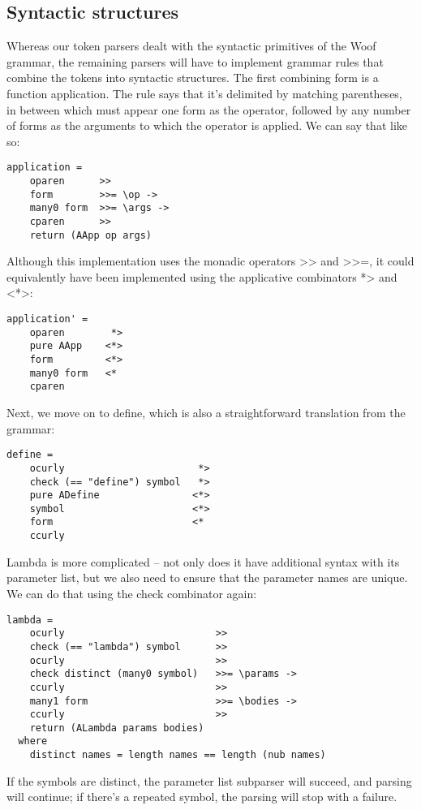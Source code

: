 \documentclass{tmr}
\begin{document}
\subsection{Syntactic structures}
Whereas our token parsers dealt with the syntactic primitives of the Woof grammar, 
the remaining parsers will have to implement grammar rules that combine the tokens
into syntactic structures.
The first combining form is a function application.  The rule says that it's delimited
by matching parentheses, in between which must appear one form as the operator, followed
by any number of forms as the arguments to which the operator is applied.  We can
say that like so:
\begin{verbatim}
application =
    oparen      >>
    form        >>= \op ->
    many0 form  >>= \args ->
    cparen      >>
    return (AApp op args)
\end{verbatim}
Although this implementation uses the monadic operators >> and >>=, it could
equivalently have been implemented using the applicative combinators *> and <*>:
\begin{verbatim}
application' =
    oparen        *>
    pure AApp    <*>
    form         <*>
    many0 form   <*
    cparen
\end{verbatim}
Next, we move on to define, which is also a straightforward translation from the grammar:
\begin{verbatim}
define =
    ocurly                       *>
    check (== "define") symbol   *>
    pure ADefine                <*>
    symbol                      <*>
    form                        <*
    ccurly
\end{verbatim}
Lambda is more complicated -- not only does it have additional syntax with its parameter list,
but we also need to ensure that the parameter names are unique.  We can do that using the 
check combinator again:
\begin{verbatim}
lambda =
    ocurly                          >>
    check (== "lambda") symbol      >>
    ocurly                          >>
    check distinct (many0 symbol)   >>= \params ->
    ccurly                          >>
    many1 form                      >>= \bodies ->
    ccurly                          >>
    return (ALambda params bodies)
  where
    distinct names = length names == length (nub names)
\end{verbatim}
If the symbols are distinct, the parameter list subparser will succeed, and parsing will
continue; if there's a repeated symbol, the parsing will stop with a failure.
\end{document}
